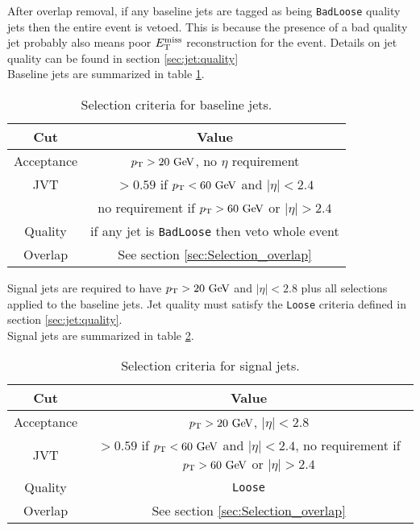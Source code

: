 \indent After overlap removal, if any baseline jets are tagged as being {\tt BadLoose} quality jets then the entire event is vetoed.  This is because the presence of a bad quality jet probably also means poor $E_{\mathrm{T}}^{\mathrm{miss}}$ reconstruction for the event.  Details on jet quality can be found in section \ref{sec:jet:quality} \\

\indent Baseline jets are summarized in table \ref{tb:jets:baseline}. \\

\begin{table}[htp]
  \begin{center}
    \begin{tabular}{c|c} \hline \hline
      Cut & Value \\ \hline \hline
      Acceptance & $\pT > 20\gev$, no $\eta$ requirement \\ \hline
      JVT & $> 0.59$ if $\pt < 60 \gev$ and $|\eta| < 2.4$ \\
             & no requirement if $\pt > 60 \gev$ or $|\eta| > 2.4$ \\ \hline
      Quality & if any jet is {\tt BadLoose} then veto whole event  \\ \hline
      Overlap & See section \ref{sec:Selection_overlap} \\ \hline
      \hline
    \end{tabular}
  \caption{Selection criteria for baseline jets.} 
  \end{center}
  \label{tb:jets:baseline}
\end{table}%

\indent Signal jets are required to have $\pt > 20\gev$ and $|\eta|<2.8$ plus all selections applied to the baseline jets. Jet quality must satisfy the {\tt Loose} criteria defined in section \ref{sec:jet:quality}. \\

\indent Signal jets are summarized in table \ref{tb:jets:signal}. \\

\begin{table}[htp]
  \begin{center}
    \begin{tabular}{c|c} \hline \hline
      Cut & Value \\ \hline \hline
      Acceptance & $\pT > 20\gev$, $|\eta| < 2.8$ \\ \hline
      JVT & $> 0.59$ if $\pt < 60 \gev$ and $|\eta| < 2.4$, no requirement if $\pt > 60 \gev$ or $|\eta| > 2.4$ \\ \hline
      Quality & {\tt Loose} \\ \hline
      Overlap & See section \ref{sec:Selection_overlap} \\ \hline
      \hline
    \end{tabular}
    \caption{Selection criteria for signal jets.} 
  \end{center}
  \label{tb:jets:signal}
\end{table}%

